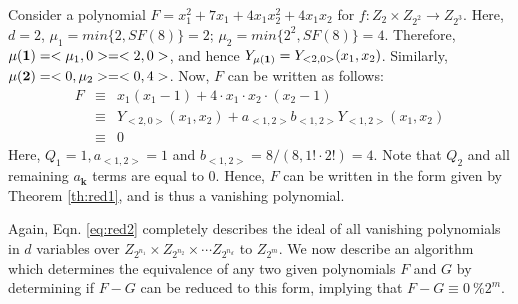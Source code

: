 \begin{Example}\label{ex:red1}
Consider a polynomial $F = x_1^2 + 7x_1 + 4x_1 x_2^2 + 4x_1 x_2$ for
$f:Z_2 \times Z_{2^2} \rightarrow Z_{2^3}$. Here, $d = 2$, $\mu_1 =
min\{2, SF(8)\} = 2$; $\mu_2 = min\{2^2, SF(8)\} = 4$. Therefore,
${\bf   \mu(1)} = <\mu_1, 0> = <2, 0>$, and hence $Y_{\bf \mu(1)} =
Y_{<2,0>}(x_1,x_2)$. Similarly, ${\bf  \mu(2)} = <0, \mu_2> = <0,
4>$. Now, $F$ can be written as follows: 
\vspace{-0.1in}
\begin{eqnarray}
F  &\equiv & x_1(x_1 - 1) + 4\cdot x_1\cdot x_2\cdot (x_2 - 1)\nonumber \\
   &\equiv& Y_{<2,0>}(x_1,x_2) + a_{<1,2>}b_{<1,2>}Y_{<1,2>}(x_1,x_2)
   \nonumber \\
   &\equiv& 0 \nonumber
\end{eqnarray}
Here, $Q_1 = 1, a_{<1,2>} = 1$ and $b_{<1,2>} = 8/(8,1!\cdot 2!) =
4$. Note that $Q_2$ and all remaining $a_\textbf{k}$ terms are equal
to $0$. Hence, $F$ can be written in the form given by Theorem
\ref{th:red1}, and is thus a vanishing polynomial.
\end{Example}

Again, Eqn. \ref{eq:red2} completely describes the ideal of all
vanishing polynomials in $d$ variables over $Z_{2^{n_1}} \times
Z_{2^{n_2}} \times \cdots Z_{2^{n_d}}$ to $Z_{2^m}$. We now describe
an algorithm which determines the equivalence of any two given
polynomials $F$ and $G$ by determining if $F-G$ can be reduced to this
form, implying that $F-G \equiv 0 ~\%2^m$.


